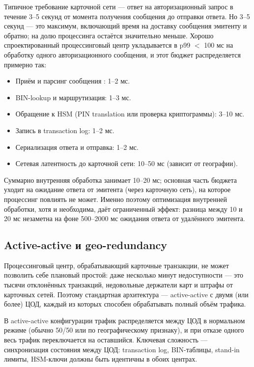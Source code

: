 Типичное требование карточной сети — ответ на авторизационный
запрос в течение 3--5 секунд от момента получения сообщения
до отправки ответа. Но 3--5 секунд — это максимум, включающий
время на доставку сообщения эмитенту и обратно; на долю
процессинга остаётся значительно меньше. Хорошо спроектированный
процессинговый центр укладывается в p99 $<$ 100 мс
на обработку одного авторизационного сообщения, и этот бюджет
распределяется примерно так:

\begin{itemize}
  \item Приём и парсинг сообщения : 1--2 мс.
  \item BIN-lookup и маршрутизация: 1--3 мс.
  \item Обращение к HSM (PIN translation или проверка
        криптограммы): 3--10 мс.
  \item Запись в transaction log: 1--2 мс.
  \item Сериализация ответа и отправка: 1--2 мс.
  \item Сетевая латентность до карточной сети: 10--50 мс
        (зависит от географии).
\end{itemize}

Суммарно внутренняя обработка занимает 10--20 мс; основная
часть бюджета уходит на ожидание ответа от эмитента (через
карточную сеть), на которое процессинг повлиять не может.
Именно поэтому оптимизация внутренней обработки, хотя
и необходима, даёт ограниченный эффект: разница между
10 и 20 мс незаметна на фоне 500--2000 мс ожидания ответа
от удалённого эмитента.

\subsection*{Active-active и geo-redundancy}

Процессинговый центр, обрабатывающий карточные транзакции,
не может позволить себе плановый простой: даже несколько минут
недоступности — это тысячи отклонённых транзакций, недовольные
держатели карт и штрафы от карточных сетей. Поэтому стандартная
архитектура — active-active с двумя (или более) ЦОД,
каждый из которых способен обрабатывать полный объём трафика.

В active-active конфигурации трафик распределяется между ЦОД
в нормальном режиме (обычно 50/50 или по географическому
признаку), и при отказе одного весь трафик переключается
на оставшийся. Ключевая сложность — синхронизация состояния
между ЦОД: transaction log, BIN-таблицы, stand-in лимиты,
HSM-ключи должны быть идентичны в обоих центрах.

